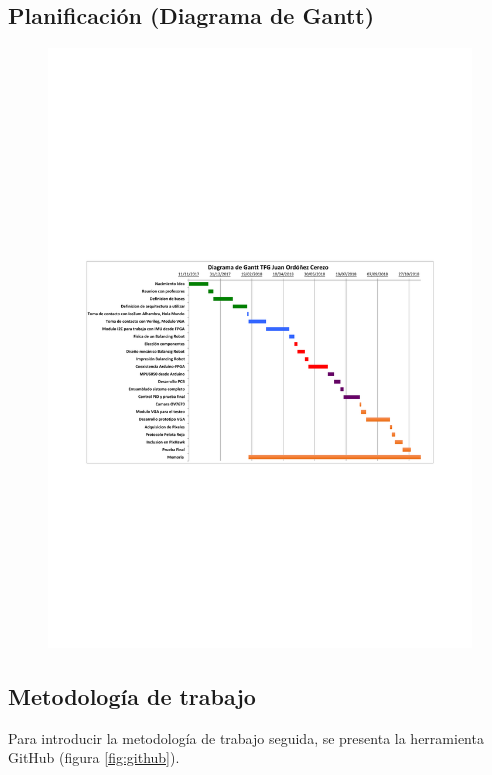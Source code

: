 \subsection{Planificación (Diagrama de Gantt)}

\begin{center}
	\begin{figure}[H]
		\center
		\includegraphics[trim = 15mm 85mm 0mm 100mm,clip, angle=-90, scale = 1.4]{imagenes/Introduction/Gantt.pdf}
		\label{fig:diagramaGantt}
	\end{figure}
\end{center}
\subsection{Metodología de trabajo}
Para introducir la metodología de trabajo seguida, se presenta la herramienta GitHub (figura \ref{fig:github}).\newline 

